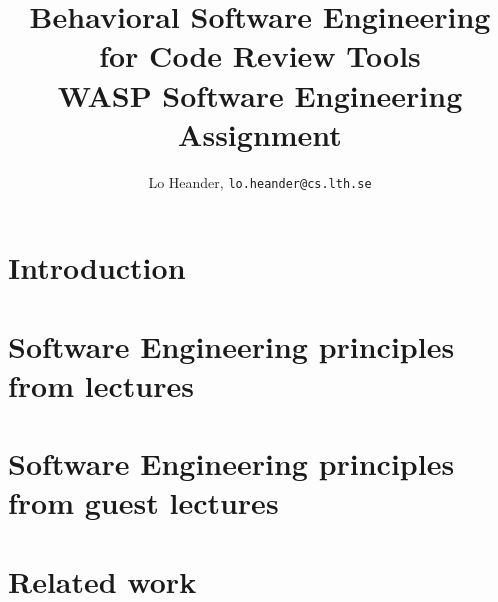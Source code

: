 \documentclass[a4paper]{article}
\title{Behavioral Software Engineering for Code Review Tools\\
\large WASP Software Engineering Assignment}
\author{\small Lo Heander, \texttt{\small lo.heander@cs.lth.se}}
\date{}
\begin{document}
\maketitle

\section*{Introduction}

\section*{Software Engineering principles from lectures}

\section*{Software Engineering principles from guest lectures}

\section*{Related work}



\end{document}

